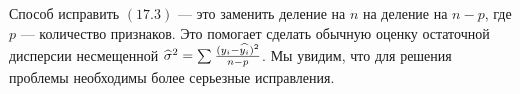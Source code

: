 Способ исправить $(17.3)$ --- это заменить деление на $n$ на деление на $n - p$, где $p$ --- количество признаков. Это помогает сделать обычную оценку остаточной дисперсии несмещенной $\widehat{\sigma}^{2} = \sum_{}^{}  \frac{(y_{i} - \widehat{y_{i}})^{2}}{n- p}$. Мы увидим, что для решения проблемы необходимы более серьезные исправления.
